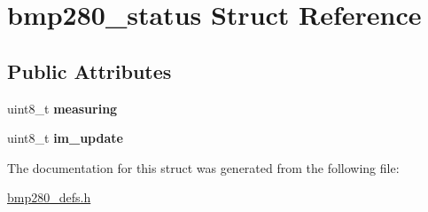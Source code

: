 \hypertarget{structbmp280__status}{}\section{bmp280\+\_\+status Struct Reference}
\label{structbmp280__status}
\subsection*{Public Attributes}
\begin{DoxyCompactItemize}
\item 
\mbox{\label{structbmp280__status_a9bcedf81723886527a69f60a27198777}} 
uint8\+\_\+t {\bfseries measuring}
\item 
\mbox{\label{structbmp280__status_a98b02b885d4749a89331886490fd8b2e}} 
uint8\+\_\+t {\bfseries im\+\_\+update}
\end{DoxyCompactItemize}


The documentation for this struct was generated from the following file\+:\begin{DoxyCompactItemize}
\item 
\mbox{\hyperlink{bmp280__defs_8h}{bmp280\+\_\+defs.\+h}}\end{DoxyCompactItemize}
